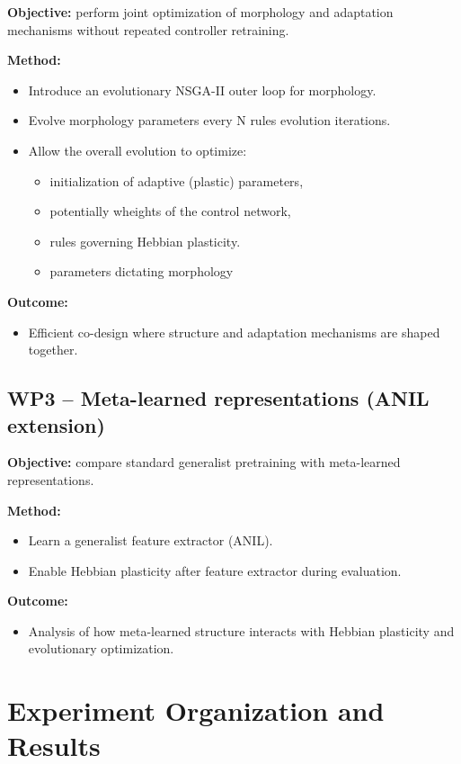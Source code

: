 \documentclass[letterpaper,10pt]{article}
\begin{document}
\textbf{Objective:} perform joint optimization of morphology and adaptation mechanisms without repeated controller retraining.

\textbf{Method:}
\begin{itemize}
    \item Introduce an evolutionary NSGA-II outer loop for morphology.
    \item Evolve morphology parameters every N rules evolution iterations.
    \item Allow the overall evolution to optimize:
    \begin{itemize}
        \item initialization of adaptive (plastic) parameters,
        \item potentially wheights of the control network,
        \item rules governing Hebbian plasticity.
        \item parameters dictating morphology
    \end{itemize}
\end{itemize}

\textbf{Outcome:}
\begin{itemize}
    \item Efficient co-design where structure and adaptation mechanisms are shaped together.
\end{itemize}

\subsection*{WP3 -- Meta-learned representations (ANIL extension)}

\textbf{Objective:} compare standard generalist pretraining with meta-learned representations.

\textbf{Method:}
\begin{itemize}
    \item Learn a generalist feature extractor (ANIL).
    \item Enable Hebbian plasticity after feature extractor during evaluation.
\end{itemize}

\textbf{Outcome:}
\begin{itemize}
    \item Analysis of how meta-learned structure interacts with Hebbian plasticity and evolutionary optimization.
\end{itemize}

\section{Experiment Organization and Results}
\end{document}
